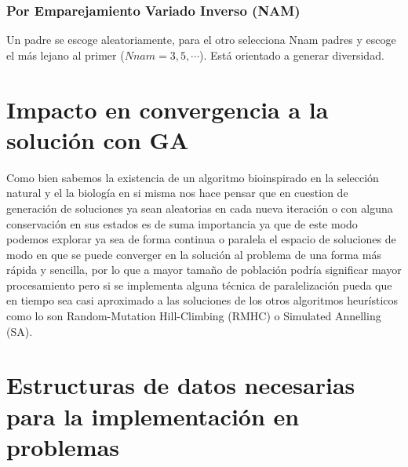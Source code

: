 \documentclass[10pt]{article}
\begin{document}
\subsubsection{Por Emparejamiento Variado Inverso (NAM)}
Un padre se escoge aleatoriamente, para el otro selecciona Nnam padres y escoge el más lejano al primer (\(\displaystyle Nnam=3,5,\cdots\)). Está orientado a generar diversidad.
\section{Impacto en convergencia a la solución con GA}
Como bien sabemos la existencia de un algoritmo bioinspirado en la selección natural y el la biología en si misma nos hace pensar que en cuestion de generación de soluciones ya sean aleatorias en cada nueva iteración o con alguna conservación en sus estados es de suma importancia ya que de este modo podemos explorar ya sea de forma continua o paralela el espacio de soluciones de modo en que se puede converger en la solución al problema de una forma más rápida y sencilla, por lo que a mayor tamaño de población podría significar mayor procesamiento pero si se implementa alguna técnica de paralelización pueda que en tiempo sea casi aproximado a las soluciones de los otros algoritmos heurísticos como lo son Random-Mutation Hill-Climbing (RMHC) o Simulated Annelling (SA).


\section{Estructuras de datos necesarias para la implementación en problemas}
\end{document}
